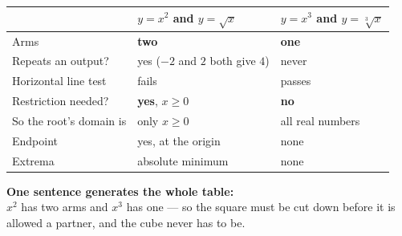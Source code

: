 \documentclass[aspectratio=169, 11pt]{beamer}
\begin{document}
\begin{frame}[t, plain]
  \begin{center}
  \footnotesize
  \renewcommand{\arraystretch}{1.4}
  \begin{tabular}{lll}
  \hline
   & \textbf{$y=x^{2}$ \; and \; $y=\sqrt{x}$} & \textbf{$y=x^{3}$ \; and \; $y=\sqrt[3]{x}$} \\
  \hline
  Arms & \textbf{two} & \textbf{one} \\
  Repeats an output? & yes ($-2$ and $2$ both give $4$) & never \\
  Horizontal line test & fails & passes \\
  Restriction needed? & \textbf{yes}, $x\ge0$ & \textbf{no} \\
  So the root's domain is & only $x\ge0$ & all real numbers \\
  Endpoint & yes, at the origin & none \\
  Extrema & absolute minimum & none \\
  \hline
  \end{tabular}
  \end{center}
  \vspace{8pt}
  \begin{center}
    \textbf{One sentence generates the whole table:} \\[3pt]
    $x^{2}$ has two arms and $x^{3}$ has one --- so the square must be cut down before it is allowed
    a partner, and the cube never has to be.
  \end{center}
\end{frame}
\end{document}
